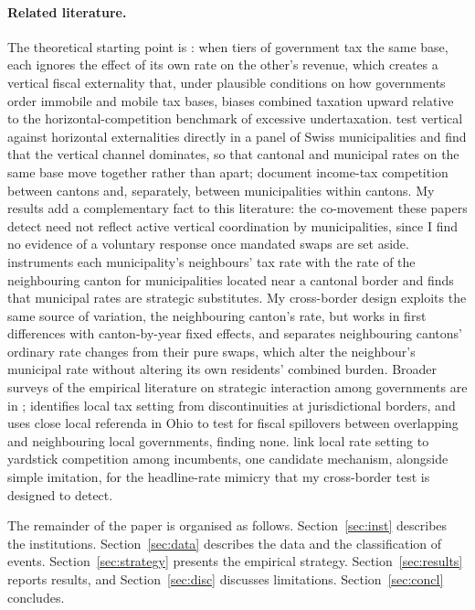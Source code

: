\documentclass[11pt,a4paper]{article}
\begin{document}
\paragraph{Related literature.} The theoretical starting point is \citet{KeenKotsogiannis2002}: when tiers of government tax the same base, each ignores the effect of its own rate on the other's revenue, which creates a vertical fiscal externality that, under plausible conditions on how governments order immobile and mobile tax bases, biases combined taxation upward relative to the horizontal-competition benchmark of excessive undertaxation. \citet{BruelhartJametti2006} test vertical against horizontal externalities directly in a panel of Swiss municipalities and find that the vertical channel dominates, so that cantonal and municipal rates on the same base move together rather than apart; \citet{FeldKirchgaessner2001} document income-tax competition between cantons and, separately, between municipalities within cantons. My results add a complementary fact to this literature: the co-movement these papers detect need not reflect active vertical coordination by municipalities, since I find no evidence of a voluntary response once mandated swaps are set aside. \citet{Parchet2019} instruments each municipality's neighbours' tax rate with the rate of the neighbouring canton for municipalities located near a cantonal border and finds that municipal rates are strategic substitutes. My cross-border design exploits the same source of variation, the neighbouring canton's rate, but works in first differences with canton-by-year fixed effects, and separates neighbouring cantons' ordinary rate changes from their pure swaps, which alter the neighbour's municipal rate without altering its own residents' combined burden. Broader surveys of the empirical literature on strategic interaction among governments are in \citet{Brueckner2003}; \citet{Agrawal2015} identifies local tax setting from discontinuities at jurisdictional borders, and \citet{Isen2014} uses close local referenda in Ohio to test for fiscal spillovers between overlapping and neighbouring local governments, finding none. \citet{BesleyCase1995} link local rate setting to yardstick competition among incumbents, one candidate mechanism, alongside simple imitation, for the headline-rate mimicry that my cross-border test is designed to detect.

The remainder of the paper is organised as follows. Section~\ref{sec:inst} describes the institutions. Section~\ref{sec:data} describes the data and the classification of events. Section~\ref{sec:strategy} presents the empirical strategy. Section~\ref{sec:results} reports results, and Section~\ref{sec:disc} discusses limitations. Section~\ref{sec:concl} concludes.
\end{document}
